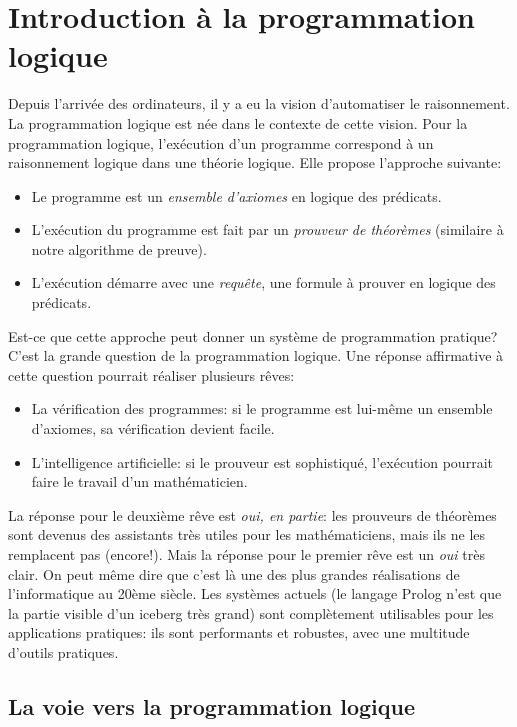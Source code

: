 \chapter{Introduction à la programmation logique}
\label{prolog}

Depuis l'arrivée des ordinateurs, il y a eu la vision d'automatiser le raisonnement.
La programmation logique est née dans le contexte de cette vision.
Pour la programmation logique, l'exécution d'un programme correspond à un raisonnement logique dans une théorie logique.
Elle propose l'approche suivante:
\begin{itemize} 
\item Le programme est un {\em ensemble d'axiomes} en logique des prédicats.
\item L'exécution du programme est fait par un {\em prouveur de théorèmes} (similaire à notre algorithme de preuve).
\item L'exécution démarre avec une {\em requête}, une formule à prouver en logique des prédicats.
\end{itemize}
Est-ce que cette approche peut donner un système de programmation pratique?
C'est la grande question de la programmation logique.
Une réponse affirmative à cette question pourrait réaliser plusieurs rêves:
\begin{itemize}
\item La vérification des programmes: si le programme est lui-même un ensemble d'axiomes, sa vérification devient facile.
\item L'intelligence artificielle: si le prouveur est sophistiqué, l'exécution pourrait faire le travail d'un mathématicien.
\end{itemize}
La réponse pour le deuxième rêve est {\em oui, en partie}: les prouveurs de théorèmes sont devenus
des assistants très utiles pour les mathématiciens, mais ils ne les remplacent pas (encore!).
Mais la réponse pour le premier rêve est un {\em oui} très clair.
On peut même dire que c'est là une des plus grandes réalisations de l'informatique au 20ème siècle.
Les systèmes actuels (le langage Prolog n'est que la partie visible d'un iceberg très grand)
sont complètement utilisables pour les applications pratiques:
ils sont performants et robustes, avec une multitude d'outils pratiques.

\section{La voie vers la programmation logique}

